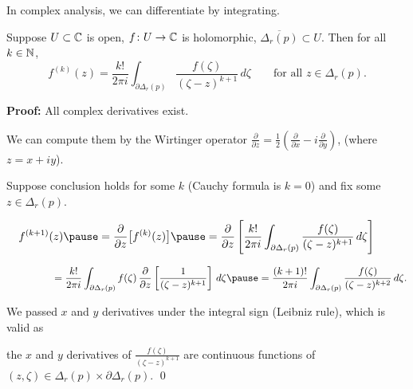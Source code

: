 \documentclass[10pt,aspectratio=169]{beamer}
\begin{document}
\begin{frame}
In complex analysis, we can differentiate by integrating.

\pause

\begin{theorem}
Suppose $U \subset {\mathbb{C}}$ is open, $f \colon U \to {\mathbb{C}}$ is holomorphic,
$\overline{\Delta_r(p)} \subset U$.
\pause
Then for all $k \in {\mathbb{N}}$,
\[
f^{(k)}(z)
=
\frac{k!}{2\pi i}
\int_{\partial \Delta_r(p)}
\frac{f(\zeta)}{(\zeta-z)^{k+1}}
\,
d \zeta
\qquad
\text{for all } z \in \Delta_r(p) .
\]
\end{theorem}

\pause

\textbf{Proof:}
All complex derivatives exist.

\pause

We can compute them by
the Wirtinger operator
$\frac{\partial}{\partial z} =
\frac{1}{2}
\left(
\frac{\partial}{\partial x} - i
\frac{\partial}{\partial y}
\right)$,
(where $z=x+iy$).
\pause

Suppose conclusion holds for some $k$ (Cauchy formula is $k=0$) and fix some $z \in \Delta_r(p)$.

\medskip
\pause

$\displaystyle
\quad
f^{(k+1)}(z)
\pause
=
\frac{\partial }{\partial z}
\bigl[ f^{(k)}(z) \bigr]
\pause
=
\frac{\partial }{\partial z}
\left[
\frac{k!}{2\pi i}
\int_{\partial \Delta_r(p)}
\frac{f(\zeta)}{(\zeta-z)^{k+1}}
\,
d \zeta
\right]
$

\medskip
\pause

$\displaystyle
\qquad \qquad \,\,\,\,
= 
\frac{k!}{2\pi i}
\int_{\partial \Delta_r(p)}
f(\zeta)
\,
\frac{\partial }{\partial z}
\left[
\frac{1}{(\zeta-z)^{k+1}}
\right]
\,
d \zeta
\pause
= 
\frac{(k+1)!}{2\pi i}
\int_{\partial \Delta_r(p)}
\frac{f(\zeta)}{(\zeta-z)^{k+2}}
\,
d \zeta .
$

\pause
\medskip

We passed $x$ and $y$ derivatives under the integral sign (Leibniz rule),
\pause
which is valid as

the $x$ and $y$ derivatives of
$\frac{f(\zeta)}{(\zeta-z)^{k+1}}$ are continuous
functions of $(z,\zeta) \in \Delta_r(p) \times \partial \Delta_r(p)$.
\qed
\end{frame}
\end{document}
